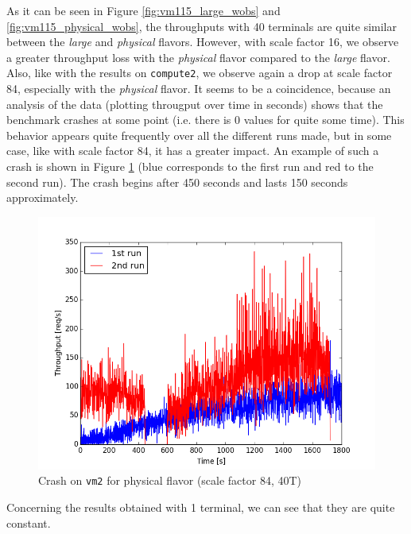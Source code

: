 As it can be seen in Figure \ref{fig:vm115_large_wobs} and \ref{fig:vm115_physical_wobs}, the throughputs with 40 terminals are quite similar between the \textit{large} and \textit{physical} flavors. 
However, with scale factor 16, we observe a greater throughput loss with the \textit{physical} flavor compared to the \textit{large} flavor. 
Also, like with the results on \texttt{compute2}, we observe again a drop at scale factor 84, especially with the \textit{physical} flavor. 
It seems to be a coincidence, because an analysis of the data (plotting througput over time in seconds) shows that the benchmark crashes at some point (i.e. there is 0 values for quite some time).
This behavior appears quite frequently over all the different runs made, but in some case, like with scale factor 84, it has a greater impact.
An example of such a crash is shown in Figure \ref{fig:vm115_physical_wobs_crash} (blue corresponds to the first run and red to the second run).
The crash begins after 450 seconds and lasts 150 seconds approximately.

\begin{figure}[h]
	\centering
	\includegraphics[scale=0.5]{figures/results/vm115_physical_wobs_crash.png}
	\caption{Crash on \texttt{vm2} for physical flavor (scale factor 84, 40T)}
	\label{fig:vm115_physical_wobs_crash}
\end{figure}

Concerning the results obtained with 1 terminal, we can see that they are quite constant.

